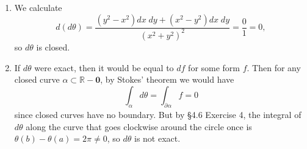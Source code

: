 \documentclass[10pt]{report}
\begin{document}
\begin{enumerate}
	\item We calculate
		\[
			d(d\theta) = \frac{(y^2-x^2)dx\;dy + (x^2-y^2)dx\;dy}{(x^2+y^2)^2} = \frac{0}{1} =0,
		\] so $d\theta$ is closed.

	\item If $d\theta$ were exact, then it would be equal to $df$ for some form $f$. Then for any closed curve $\alpha \subset \mathbb{R}-\mathbf{0}$, by Stokes' theorem we would have
		\[
		\int_{\alpha} d\theta = \int_{\partial_{}{\alpha} } f = 0
		\] since closed curves have no boundary. But by \S 4.6 Exercise 4, the integral of $d\theta$ along the curve that goes clockwise around the circle once is $\theta(b)-\theta(a)=2\pi\neq 0$, so $d\theta$ is not exact.
\end{enumerate}
\end{document}
